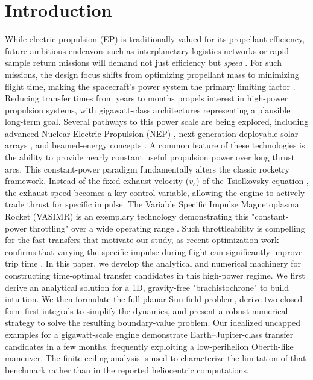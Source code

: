 \documentclass[journal,a4paper]{IEEEtran}
\begin{document}
\section{Introduction}
While electric propulsion (EP) is traditionally valued for its propellant efficiency, future ambitious endeavors such as interplanetary logistics networks or rapid sample return missions will demand not just efficiency but \emph{speed} \cite{Conway2010, PinoHowell2020, Fogel2020}. For such missions, the design focus shifts from optimizing propellant mass to minimizing flight time, making the spacecraft's power system the primary limiting factor \cite{Mazouffre2016}.
Reducing transfer times from years to months propels interest in high-power propulsion systems, with gigawatt-class architectures representing a plausible long-term goal. Several pathways to this power scale are being explored, including advanced Nuclear Electric Propulsion (NEP) \cite{Peakman2023, scott2019value}, next-generation deployable solar arrays \cite{ChangDiaz2019}, and beamed-energy concepts \cite{Sheerin2021}. A common feature of these technologies is the ability to provide nearly constant useful propulsion power over long thrust arcs.
This constant-power paradigm fundamentally alters the classic rocketry framework. Instead of the fixed exhaust velocity ($v_e$) of the Tsiolkovsky equation \cite{Tsiolkovsky1903}, the exhaust speed becomes a key control variable, allowing the engine to actively trade thrust for specific impulse. The Variable Specific Impulse Magnetoplasma Rocket (VASIMR) is an exemplary technology demonstrating this "constant-power throttling" over a wide operating range \cite{Bering2011}. Such throttleability is compelling for the fast transfers that motivate our study, as recent optimization work confirms that varying the specific impulse during flight can significantly improve trip time \cite{DiPasquale2024}.
In this paper, we develop the analytical and numerical machinery for constructing time-optimal transfer candidates in this high-power regime. We first derive an analytical solution for a 1D, gravity-free "brachistochrone" to build intuition. We then formulate the full planar Sun-field problem, derive two closed-form first integrals to simplify the dynamics, and present a robust numerical strategy to solve the resulting boundary-value problem. Our idealized uncapped examples for a gigawatt-scale engine demonstrate Earth--Jupiter-class transfer candidates in a few months, frequently exploiting a low-perihelion Oberth-like maneuver. The finite-ceiling analysis is used to characterize the limitation of that benchmark rather than in the reported heliocentric computations.
\end{document}

